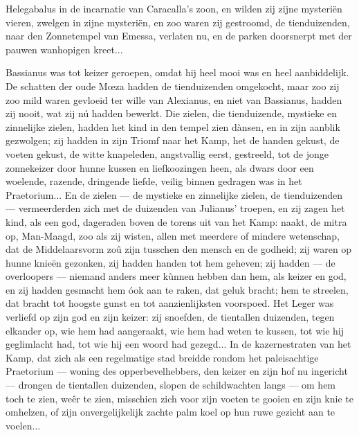 \documentclass[a4paper, 12pt, oneside, dutch]{article}
\begin{document}
Helegabalus in de incarnatie van Caracalla's zoon, en wilden zij zijne mysteriën vieren, zwelgen in zijne mysteriën, en zoo waren zij gestroomd, de tienduizenden, naar den Zonnetempel van Emessa, verlaten nu, en de parken doorsnerpt met der pauwen wanhopigen kreet...

Bassianus was tot keizer geroepen, omdat hij heel mooi was en heel aanbiddelijk. De schatten der oude Mœza hadden de tienduizenden omgekocht, maar zoo zij zoo mild waren gevloeid ter wille van Alexianus, en niet van Bassianus, hadden zij nooit, wat zij nú hadden bewerkt. Die zielen, die tienduizende, mystieke en zinnelijke zielen, hadden het kind in den tempel zien dànsen, en in zijn aanblik gezwolgen; zij hadden in zijn Triomf naar het Kamp, het de handen gekust, de voeten gekust, de witte knapeleden, angstvallig eerst, gestreeld, tot de jonge zonnekeizer door hunne kussen en liefkoozingen heen, als dwars door een woelende, razende, dringende liefde, veilig binnen gedragen was in het Praetorium... En de zielen --- de mystieke en zinnelijke zielen, de tienduizenden --- vermeerderden zich met de duizenden van Julianus' troepen, en zij zagen het kind, als een god, dageraden boven de torens uit van het Kamp: naakt, de mitra op, Man-Maagd, zoo als zij wisten, allen met meerdere of mindere wetenschap, dat de Middelaarsvorm zoû zijn tusschen den mensch en de godheid; zij waren op hunne knieën gezonken, zij hadden handen tot hem geheven; zij hadden --- de overloopers --- niemand anders meer kùnnen hebben dan hem, als keizer en god, en zij hadden gesmacht hem óok aan te raken, dat geluk bracht; hem te streelen, dat bracht tot hoogste gunst en tot aanzienlijksten voorspoed. Het Leger was verliefd op zijn god en zijn keizer: zij snoefden, de tientallen duizenden, tegen elkander op, wie hem had aangeraakt, wie hem had weten te kussen, tot wie hij geglimlacht had, tot wie hij een woord had gezegd... In de kazernestraten van het Kamp, dat zich als een regelmatige stad breidde rondom het paleisachtige Praetorium --- woning des opperbevelhebbers, den keizer en zijn hof nu ingericht --- drongen de tientallen duizenden, slopen de schildwachten langs --- om hem toch te zien, weêr te zien, misschien zich voor zijn voeten te gooien en zijn knie te omhelzen, of zijn onvergelijkelijk zachte palm koel op hun ruwe gezicht aan te voelen...
\end{document}
